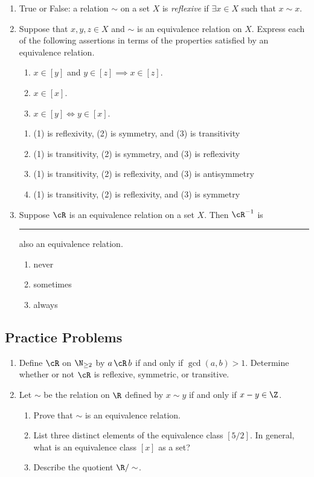\begin{enumerate}
\item True or False: a relation $\sim$ on a set $X$ is \emph{reflexive} if $\exists x\in X$ such that $x\sim x$.

\item Suppose that $x,y,z\in X$ and $\sim$ is an equivalence relation on $X$. Express each of the following assertions in terms of the properties satisfied by an equivalence relation.
    \begin{enumerate}[label=(\arabic*)]
      \item $x\in[y]$ and $y\in[z]\implies x\in[z]$.
      \item $x\in[x]$.
      \item $x\in[y]\iff y\in[x]$.
  	\end{enumerate}
  	\begin{enumerate}
  	    \item (1) is reflexivity, (2) is symmetry, and (3) is transitivity
  	    \item (1) is transitivity, (2) is symmetry, and (3) is reflexivity
  	    \item (1) is transitivity, (2) is reflexivity, and (3) is antisymmetry
  	    \item (1) is transitivity, (2) is reflexivity, and (3) is symmetry
  	\end{enumerate}
  	
\item Suppose $\cR$ is an equivalence relation on a set $X$. Then $\cR^{-1}$ is \rule{2cm}{0.15mm} also an equivalence relation.
\begin{enumerate}
    \item never
    \item sometimes
    \item always
\end{enumerate}
\end{enumerate}

\subsection*{Practice Problems}

\begin{enumerate}\renewcommand{\labelenumi}{\thesubsection.\theenumi}
\item Define $\cR$ on $\N_{\geq 2}$ by $a \, \cR \, b$ if and only if $\gcd(a,b) > 1$. Determine whether or not $\cR$ is reflexive, symmetric, or transitive. 

\item Let $\sim$ be the relation on $\R$ defined by $x \sim y$ if and only if $x - y \in \Z$.
\begin{enumerate}
    \item Prove that $\sim$ is an equivalence relation.
    \item List three distinct elements of the equivalence class $[5/2]$. In general, what is an equivalence class $[x]$ as a set?
    \item Describe the quotient $\R/\sim$.
\end{enumerate}
\end{enumerate}

